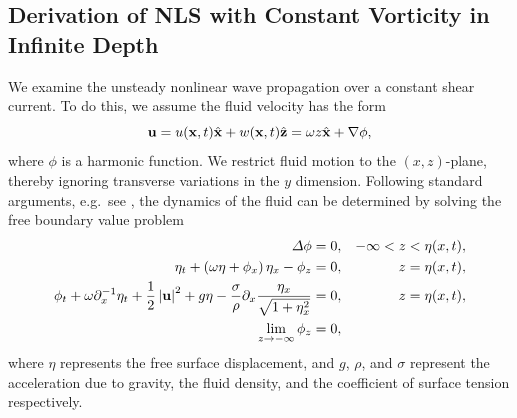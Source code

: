 \documentclass{JFM_Style/jfm}
\newcommand{\pd}{\partial}
\begin{document}
\subsection{Derivation of NLS with Constant Vorticity in Infinite Depth}
We examine the unsteady nonlinear wave propagation over a constant shear current.  To do this, we assume the fluid velocity has the form
\[
{\bf u} = u({\bf x},t)\hat{{\bf x}} + w({\bf x},t)\hat{{\bf z}} = \omega z\hat{{\bf x}} + \nabla \phi,
\]
where $\phi$ is a harmonic function.  We restrict fluid motion to the $(x,z)$-plane, thereby ignoring transverse variations in the $y$ dimension.   Following standard arguments, e.g.~see \cite{ashton}, the dynamics of the fluid can be determined by solving the free boundary value problem
\begin{align}
\Delta \phi = 0, & & -\infty< z < \eta(x,t), \nonumber \\
\eta_{t} +\left(\omega\eta+\phi_{x}\right)\eta_{x} - \phi_{z} = 0, & & z=\eta(x,t), \label{kine}\\
\phi_{t} + \omega\pd_{x}^{-1}\eta_{t} + \frac{1}{2} \left|{\bf
    u}\right|^{2} + g\eta -
\frac{\sigma}{\rho}\pd_{x}\frac{\eta_{x}}{\sqrt{1+\eta_{x}^{2}}}= 0, &
& z=\eta(x,t), \label{bernou}\\
\lim_{z\rightarrow -\infty} \phi_{z} = 0, \nonumber
\end{align}
where $\eta$ represents the free surface displacement, and $g$, $\rho$, and $\sigma$ represent the acceleration due to gravity, the fluid density, and the coefficient of surface tension respectively.
\end{document}
